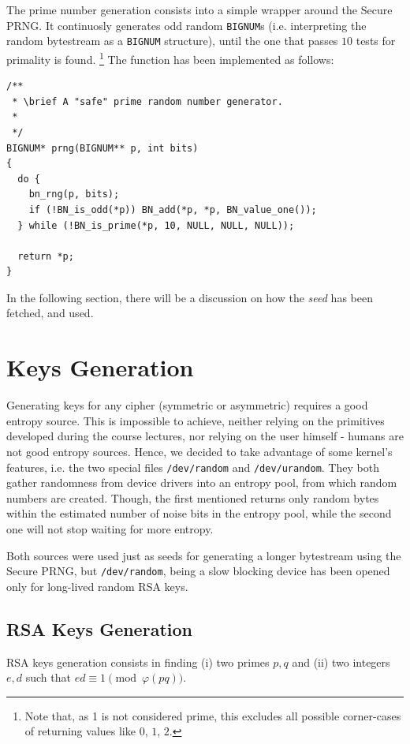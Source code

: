 \documentclass[10pt,a4paper]{report}
\newcommand{\code}[1]{\texttt{#1}}
\begin{document}
The prime number generation consists into a simple wrapper around the Secure
PRNG. It continuosly generates odd random \code{BIGNUM}s (i.e. interpreting the
random bytestream as a \code{BIGNUM} structure), until the one that passes $10$ tests
for primality is found.
\footnote{Note that, as 1 is not considered prime, this
  excludes all possible corner-cases of returning values like $0$, $1$, $2$.}
The function has been implemented as follows:
\begin{verbatim}
/**
 * \brief A "safe" prime random number generator.
 *
 */
BIGNUM* prng(BIGNUM** p, int bits)
{
  do {
    bn_rng(p, bits);
    if (!BN_is_odd(*p)) BN_add(*p, *p, BN_value_one());
  } while (!BN_is_prime(*p, 10, NULL, NULL, NULL));

  return *p;
}

\end{verbatim}
In the following section, there will be a discussion on how the \emph{seed} has
been fetched, and used.

\section{Keys Generation}

Generating keys for any cipher (symmetric or asymmetric) requires a good entropy
source. This is impossible to achieve, neither relying on the primitives
developed during the course lectures, nor relying on the user himself - humans
are not good entropy sources. Hence, we decided to take advantage of some
kernel’s features, i.e. the two special files \code{/dev/random} and
\code{/dev/urandom}.
They both gather randomness from device drivers into an entropy pool, from which
random numbers are created.
Though, the first mentioned returns only random bytes within the estimated
number of noise bits in the entropy pool, while the second one will not stop waiting
for more entropy.

Both sources were used just as seeds for generating a longer bytestream using
the Secure PRNG, but \code{/dev/random}, being a slow blocking device has been
opened only for long-lived random RSA keys.

\subsection{RSA Keys Generation}

RSA keys generation consists in finding (i) two primes $p, q$ and (ii)
two integers $e, d$ such that \linebreak $ed \equiv 1 \pmod{\varphi(pq)}$.
\end{document}
